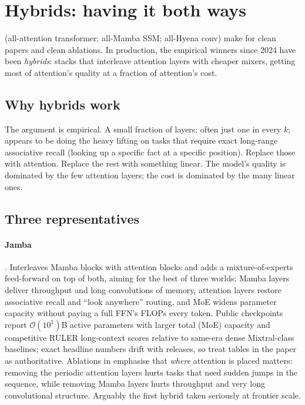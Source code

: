 \section{Hybrids: having it both ways}
\label{ch:hybrids}

 (all-attention transformer; all-Mamba
SSM; all-Hyena conv) make for clean papers and clean ablations. In
production, the empirical winners since 2024 have been
\emph{hybrids}: stacks that interleave attention layers with cheaper
mixers, getting most of attention's quality at a fraction of attention's
cost.

\subsection{Why hybrids work}

The argument is empirical. A small fraction of layers; often just one in
every \(k\); appears to be doing the heavy lifting on tasks that require
exact long-range associative recall (looking up a specific fact at a
specific position). Replace those with attention. Replace the rest with
something linear. The model's quality is dominated by the few attention
layers; the cost is dominated by the many linear ones.

\subsection{Three representatives}

\paragraph{Jamba} \citep{lieber2024jamba}. Interleaves Mamba blocks with
attention blocks and adds a mixture-of-experts feed-forward on top of
both, aiming for the best of three worlds: Mamba layers deliver
throughput and long convolutions of memory, attention layers restore
associative recall and ``look anywhere'' routing, and MoE widens
parameter capacity without paying a full FFN's FLOPs every token. Public
checkpoints report \(\mathcal{O}(10^{1})\)B active parameters with larger
total (MoE) capacity and competitive RULER long-context scores relative
to same-era dense Mixtral-class baselines; exact headline numbers drift
with releases, so treat tables in the paper as authoritative. Ablations
in \citet{lieber2024jamba} emphasise that \emph{where} attention is
placed matters: removing the periodic attention layers hurts tasks that
need sudden jumps in the sequence, while removing Mamba layers hurts
throughput and very long convolutional structure. Arguably the first
hybrid taken seriously at frontier scale.

